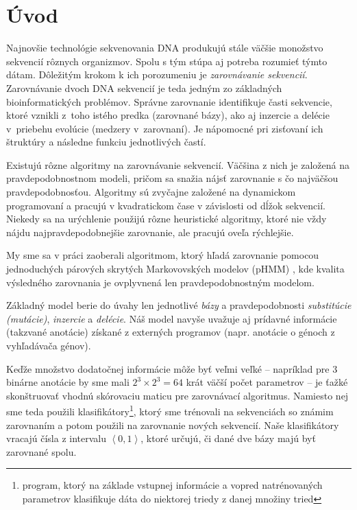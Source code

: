 \chapter*{Úvod}
{}

Najnovšie technológie sekvenovania DNA produkujú stále väčšie monožstvo sekvencií rôznych organizmov. Spolu s tým stúpa aj potreba rozumieť týmto dátam.
Dôležitým krokom k ich porozumeniu je \textit{zarovnávanie sekvencií}.
Zarovnávanie dvoch DNA sekvencií je teda jedným zo základných
bioinformatických problémov. Správne zarovnanie identifikuje časti
sekvencie, ktoré vznikli z~toho istého predka (zarovnané bázy), ako aj
inzercie a delécie v~priebehu evolúcie (medzery v~zarovnaní).
Je nápomocné pri zisťovaní ich štruktúry a následne funkciu jednotlivých častí.

Existujú rôzne algoritmy na zarovnávanie sekvencií. Väčšina z nich je založená na  pravdepodobnostnom modeli, pričom sa snažia nájsť zarovnanie s čo najväčšou pravdepodobnosťou.
Algoritmy sú zvyčajne založené na dynamickom programovaní a pracujú v kvadratickom čase v závislosti od dĺžok sekvencií. Niekedy sa na urýchlenie použijú rôzne heuristické algoritmy, ktoré nie vždy nájdu najpravdepodobnejšie zarovnanie, ale pracujú oveľa rýchlejšie.

My sme sa v práci zaoberali algoritmom, ktorý hľadá zarovnanie pomocou jednoduchých párových skrytých
Markovovských modelov (pHMM) \cite{durbin}, kde kvalita výsledného zarovnania je ovplyvnená len pravdepodobnostným modelom.

Základný model berie do úvahy len jednotlivé \textit{bázy} a pravdepodobnosti \textit{substitúcie (mutácie)}, \textit{inzercie} a \textit{delécie}.
Náš model navyše uvažuje aj prídavné informácie (takzvané anotácie) získané z externých programov (napr. anotácie o génoch z vyhľadávača génov).

Keďže množstvo dodatočnej informácie môže byť veľmi veľké -- napríklad pre 3 binárne anotácie by sme mali $2^3 \times 2^3 = 64$ krát väčší počet parametrov --
je ťažké skonštruovať vhodnú skórovaciu maticu pre zarovnávací algoritmus.
Namiesto nej sme teda použili klasifikátory\footnote{program, ktorý na základe vstupnej informácie a vopred natrénovaných parametrov klasifikuje dáta do niektorej triedy z danej množiny tried}, ktorý  sme trénovali na sekvenciách so známim zarovnaním a potom použili na zarovnanie nových sekvencií. Naše klasifikátory vracajú čísla z intervalu $\left<0, 1\right>$, ktoré určujú, či dané dve bázy majú byť zarovnané spolu.

